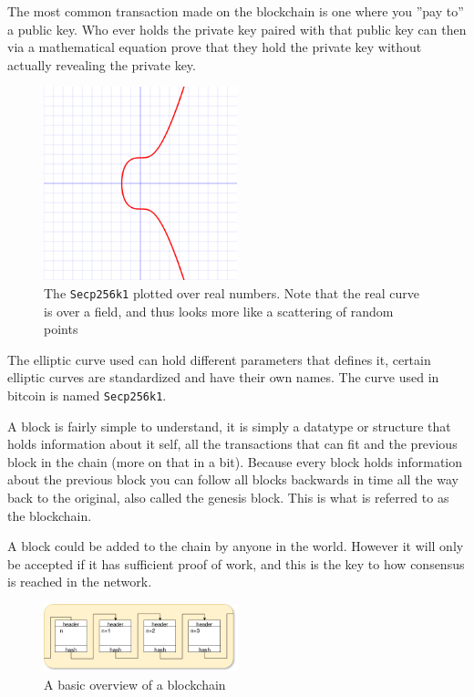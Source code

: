 The most common transaction made on the blockchain is one where you ''pay to'' a public key. Who ever holds the private key paired with that public key can then via a mathematical equation prove that they hold the private key without actually revealing the private key.\cite{quantabytes}

\begin{figure}[H]
	\centering
	\includegraphics[width=0.5\textwidth]{introduction/images/Secp256k1.png}
	\caption{The \texttt{Secp256k1} plotted over real numbers. Note that the real curve is over a field, and thus looks more like a scattering of random points}
	\label{fig:eccbasic}
\end{figure}

The elliptic curve used can hold different parameters that defines it, certain elliptic curves are standardized and have their own names. The curve used in bitcoin is named \texttt{Secp256k1}.\cite{Secp256k1_def}\cite{antonopoulos_2017}

A block is fairly simple to understand, it is simply a datatype or structure that holds information about it self, all the transactions that can fit and the previous block in the chain (more on that in a bit). Because every block holds information about the previous block you can follow all blocks backwards in time all the way back to the original, also called the genesis block.\cite{genesis} This is what is referred to as the blockchain. 

A block could be added to the chain by anyone in the world. However it will only be accepted if it has sufficient proof of work, and this is the key to how consensus is reached in the network.\cite{antonopoulos_2017}

\begin{figure}[H]
	\centering
	\includegraphics[width=0.5\textwidth]{introduction/images/blockchain.png}
	\caption{A basic overview of a blockchain}
	\label{fig:blockchain}
\end{figure}

